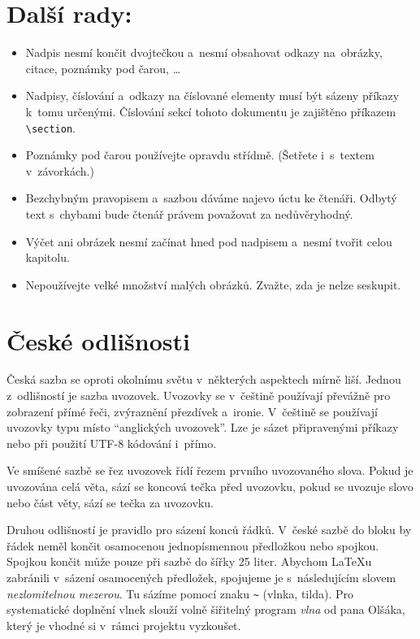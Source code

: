 \documentclass[hidelinks, 10pt, twocolumn]{article}
\begin{document}
\section{Další rady:}
\begin{itemize}
    \item Nadpis nesmí končit dvojtečkou a~nesmí obsahovat odkazy na~obrázky, citace, poznámky pod čarou, \dots
    
    \item Nadpisy, číslování a~odkazy na číslované elementy musí být sázeny příkazy k~tomu určenými.
    Číslování sekcí tohoto dokumentu je zajištěno příkazem \verb|\section|.
    
    \item Poznámky pod čarou\footnotemark{} používejte opravdu střídmě.
    (Šetřete i~s~textem v~závorkách.)
    
    
    \item Bezchybným pravopisem a~sazbou dáváme najevo úctu ke čtenáři.
    Odbytý text s~chybami bude čtenář právem považovat za nedůvěryhodný.
    
    \item Výčet ani obrázek nesmí začínat hned pod nadpisem a~nesmí tvořit celou kapitolu.
    
    \item Nepoužívejte velké množství malých obrázků.
    Zvažte, zda je nelze seskupit.
\end{itemize}

\section{České odlišnosti}

Česká sazba se oproti okolnímu světu v~některých aspektech mírně liší.
Jednou z~odlišností je sazba uvozovek.
Uvozovky se v~češtině používají převážně pro zobrazení přímé řeči, zvýraznění přezdívek a~ironie.
V~češtině se používají uvozovky typu  místo ``anglických uvozovek''.
Lze je sázet připravenými příkazy nebo při použití UTF-8 kódování i~přímo.
\par
Ve smíšené sazbě se řez uvozovek řídí řezem prvního uvozovaného slova.
Pokud je uvozována celá věta, sází se koncová tečka před uvozovku, pokud se uvozuje slovo nebo část věty, sází se tečka za uvozovku.
\par
Druhou odlišností je pravidlo pro sázení konců řádků.
V~české sazbě do bloku by řádek neměl končit osamocenou jednopísmennou předložkou nebo spojkou.
Spojkou  končit může pouze při sazbě do šířky 25 liter.
Abychom \LaTeX{}u zabránili v~sázení osamocených předložek, spojujeme je s~následujícím slovem \textit{nezlomitelnou mezerou}.
Tu sázíme pomocí znaku \verb|~| (vlnka, tilda).
Pro systematické doplnění vlnek slouží volně šiřitelný program \textit{vlna} od pana Olšáka\footnotemark{}, který je vhodné si v~rámci projektu vyzkoušet.
\par
\end{document}
